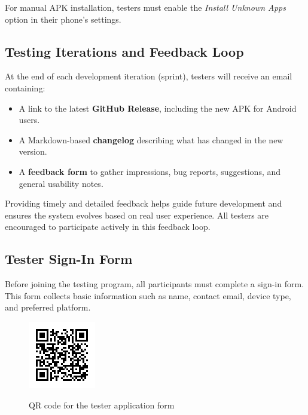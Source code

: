 \documentclass[a4paper, 12pt]{article}
\begin{document}
    For manual APK installation, testers must enable the \textit{Install Unknown Apps} option in their phone’s settings.

    \newpage
    \subsection{Testing Iterations and Feedback Loop}

    At the end of each development iteration (sprint), testers will receive an email containing:

    \begin{itemize}
      \item A link to the latest \textbf{GitHub Release}, including the new APK for Android users.
      \item A Markdown-based \textbf{changelog} describing what has changed in the new version.
      \item A \textbf{feedback form} to gather impressions, bug reports, suggestions, and general usability notes.
    \end{itemize}

    Providing timely and detailed feedback helps guide future development and ensures the system evolves based on real user experience. All testers are encouraged to participate actively in this feedback loop.

  \subsection*{Tester Sign-In Form}

    Before joining the testing program, all participants must complete a sign-in form. This form collects basic information such as name, contact email, device type, and preferred platform.

    \begin{figure}[h]
      \centering
      \href{https://forms.gle/9WeMwiAdU6G2rrWs5}{\includegraphics[width=0.35\linewidth]{tester_application_form.png}}
      \caption{QR code for the tester application form}
    \end{figure}
\end{document}
